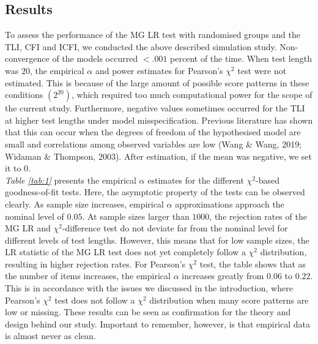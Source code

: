 \documentclass[Royal,sageapa,times,doublespace]{sagej}
\begin{document}
\subsection{Results}

To assess the performance of the MG LR test with randomised groups and the TLI, CFI and ICFI, we conducted the above described simulation study. Non-convergence of the models occurred $<.001$ percent of the time. When test length was $20$, the empirical $\alpha$ and power estimates for Pearson's $\chi^2$ test were not estimated. This is because of the large amount of possible score patterns in these conditions $(2^{20})$, which required too much computational power for the scope of the current study. Furthermore, negative values sometimes occurred for the TLI at higher test lengths under model misspecification. Previous literature has shown that this can occur when the degrees of freedom of the hypothesised model are small and correlations among observed variables are low (Wang \& Wang, 2019; Widaman \& Thompson, 2003). After estimation, if the mean was negative, we set it to $0$.\\
\indent \textit{Table \ref{tab:1}} presents the empirical $\alpha$ estimates for the different $\chi^2$-based goodness-of-fit tests. Here, the asymptotic property of the tests can be observed clearly. As sample size increases, empirical $\alpha$ approximations approach the nominal level of $0.05$. At sample sizes larger than $1000$, the rejection rates of the MG LR and $\chi^2$-difference test do not deviate far from the nominal level for different levels of test lengths. However, this means that for low sample sizes, the LR statistic of the MG LR test does not yet completely follow a $\chi^2$ distribution, resulting in higher rejection rates. For Pearson's $\chi^2$ test, the table shows that as the number of items increases, the empirical $\alpha$ increases greatly from $0.06$ to $0.22$. This is in accordance with the issues we discussed in the introduction, where Pearson's $\chi^2$ test does not follow a $\chi^2$ distribution when many score patterns are low or missing. These results can be seen as confirmation for the theory and design behind our study. Important to remember, however, is that empirical data is almost never as clean.
\end{document}
